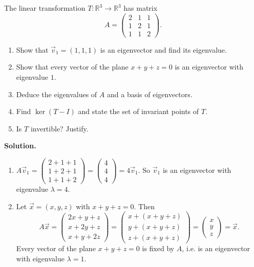 \documentclass[11pt]{article}
\begin{document}
\begin{exoresolu}
The linear transformation $T:\mathbb{R}^3\to\mathbb{R}^3$ has matrix
\[
A=\begin{pmatrix} 2 & 1 & 1 \\ 1 & 2 & 1 \\ 1 & 1 & 2 \end{pmatrix}.
\]
\begin{enumerate}
\item Show that $\vec{v}_1=(1,1,1)$ is an eigenvector and find its eigenvalue.
\item Show that every vector of the plane $x+y+z=0$ is an eigenvector with eigenvalue $1$.
\item Deduce the eigenvalues of $A$ and a basis of eigenvectors.
\item Find $\ker(T-I)$ and state the set of invariant points of $T$.
\item Is $T$ invertible? Justify.
\end{enumerate}
\tcblower
\textbf{Solution.}
\begin{enumerate}
\item $A\vec{v}_1=\begin{pmatrix}2+1+1\\1+2+1\\1+1+2\end{pmatrix}=\begin{pmatrix}4\\4\\4\end{pmatrix}=4\vec{v}_1$. So $\vec{v}_1$ is an eigenvector with eigenvalue $\lambda=4$.

\item Let $\vec{x}=(x,y,z)$ with $x+y+z=0$. Then
\[
A\vec{x}=\begin{pmatrix}2x+y+z\\x+2y+z\\x+y+2z\end{pmatrix}
=\begin{pmatrix}x+(x+y+z)\\y+(x+y+z)\\z+(x+y+z)\end{pmatrix}
=\begin{pmatrix}x\\y\\z\end{pmatrix}=\vec{x}.
\]
Every vector of the plane $x+y+z=0$ is fixed by $A$, i.e. is an eigenvector with eigenvalue $\lambda=1$.


\end{enumerate}
\end{exoresolu}
\end{document}
